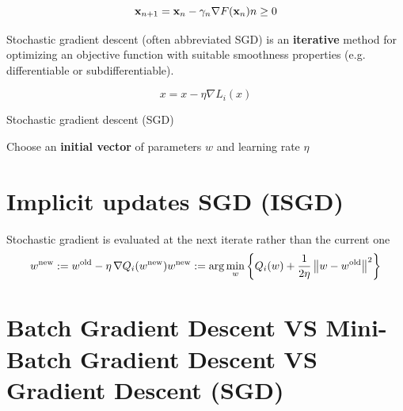 \[
    \displaystyle \mathbf {x} _{n+1}=\mathbf {x} _{n}-\gamma _{n}\nabla F(\mathbf {x} _{n}) \hfill n\geq 0
\]


Stochastic gradient descent (often abbreviated SGD) is an \textbf{iterative} method for optimizing an objective function with suitable smoothness properties (e.g. differentiable or subdifferentiable).

\[
    \displaystyle x = x - \eta\nabla L_{i}(x)
\]

\begin{algorithm}
    \caption{Stochastic gradient descent (SGD)}
    
    Choose an \textbf{initial vector} of parameters ${\displaystyle w}$ and learning rate ${\displaystyle \eta }$

\end{algorithm}


\section{Implicit updates SGD (ISGD)}\label{Implicit updates SGD (ISGD)}
Stochastic gradient is evaluated at the next iterate rather than the current one
\[
    {\displaystyle w^{\text{new}}:=w^{\text{old}}-\eta \,\nabla Q_{i}(w^{\rm {new}})} 
    \hfill 
    {\displaystyle w^{\text{new}}:=\arg \min _{w}\left\{Q_{i}(w)+{\frac {1}{2\eta }}\left\|w-w^{\text{old}}\right\|^{2}\right\}}
\]


\section{Batch Gradient Descent 
    VS 
    Mini-Batch Gradient Descent
    VS 
    Gradient Descent (SGD) 
    \cite{chatgpt}
}

